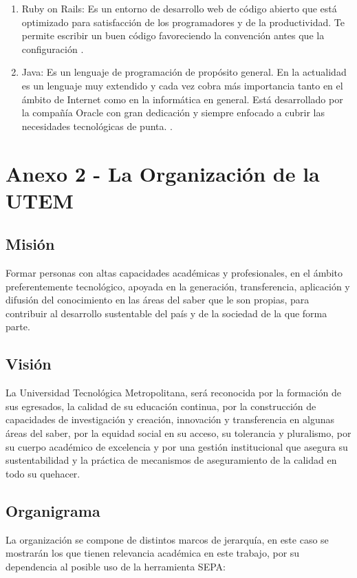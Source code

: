 \documentclass[a4paper,12pt,openany,oneside]{book}
\begin{document}
\begin{enumerate}
	\item Ruby on Rails: Es un entorno de desarrollo web de código abierto que está optimizado para satisfacción de los programadores y de la productividad. Te permite escribir un buen código favoreciendo la convención antes que la configuración \cite{data9}.
	\item Java: Es un lenguaje de programación de propósito general. En la actualidad es un lenguaje muy extendido y cada vez cobra más importancia tanto en el ámbito de Internet como en la informática en general. Está desarrollado por la compañía Oracle con gran dedicación y siempre enfocado a cubrir las necesidades tecnológicas de punta. \cite{data10}.
\end{enumerate}
\chapter{Anexo 2 - La Organización de la UTEM}
\thispagestyle{empty}
\section{Misión}
Formar personas con altas capacidades académicas y profesionales, en el ámbito preferentemente tecnológico, apoyada en la generación, transferencia, aplicación y difusión del conocimiento en las áreas del saber que le son propias, para contribuir al desarrollo sustentable del país y de la sociedad de la que forma parte.
\section{Visión}
La Universidad Tecnológica Metropolitana, será reconocida por la formación de sus egresados, la calidad de su educación continua, por la construcción de capacidades de investigación y creación, innovación y transferencia en algunas áreas del saber, por la equidad social en su acceso, su tolerancia y pluralismo, por su cuerpo académico de excelencia y por una gestión institucional que asegura su sustentabilidad y la práctica de mecanismos de aseguramiento de la calidad en todo su quehacer.
\section{Organigrama}
La organización se compone de distintos marcos de jerarquía, en este caso se mostrarán los que tienen relevancia académica en este trabajo, por su dependencia al posible uso de la herramienta SEPA:
\end{document}
